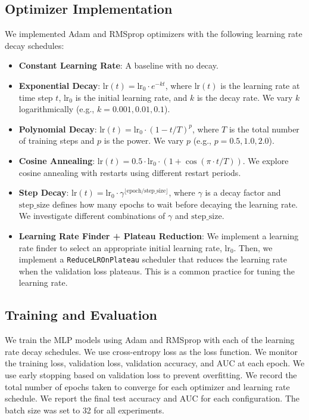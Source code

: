 \documentclass[conference]{IEEEtran}
\begin{document}
\subsection{Optimizer Implementation}
We implemented Adam and RMSprop optimizers with the following learning rate decay schedules:
\begin{itemize}
    \item \textbf{Constant Learning Rate}: A baseline with no decay.
    \item \textbf{Exponential Decay}: $\text{lr}(t) = \text{lr}_0 \cdot e^{-kt}$, where $\text{lr}(t)$ is the learning rate at time step $t$, $\text{lr}_0$ is the initial learning rate, and $k$ is the decay rate. We vary $k$ logarithmically (e.g., $k = 0.001, 0.01, 0.1$).
    \item \textbf{Polynomial Decay}: $\text{lr}(t) = \text{lr}_0 \cdot (1 - t/T)^p$, where $T$ is the total number of training steps and $p$ is the power. We vary $p$ (e.g., $p = 0.5, 1.0, 2.0$).
    \item \textbf{Cosine Annealing}: $\text{lr}(t) = 0.5 \cdot \text{lr}_0 \cdot (1 + \cos(\pi \cdot t/T))$. We explore cosine annealing with restarts using different restart periods.
    \item \textbf{Step Decay}: $\text{lr}(t) = \text{lr}_0 \cdot \gamma^{\lfloor \text{epoch}/\text{step\_size} \rfloor}$, where $\gamma$ is a decay factor and $\text{step\_size}$ defines how many epochs to wait before decaying the learning rate. We investigate different combinations of $\gamma$ and $\text{step\_size}$.
    \item \textbf{Learning Rate Finder + Plateau Reduction}: We implement a learning rate finder to select an appropriate initial learning rate, $\text{lr}_0$. Then, we implement a \texttt{ReduceLROnPlateau} scheduler that reduces the learning rate when the validation loss plateaus. This is a common practice for tuning the learning rate.
\end{itemize}

\subsection{Training and Evaluation}
We train the MLP models using Adam and RMSprop with each of the learning rate decay schedules. We use cross-entropy loss as the loss function. We monitor the training loss, validation loss, validation accuracy, and AUC at each epoch. We use early stopping based on validation loss to prevent overfitting. We record the total number of epochs taken to converge for each optimizer and learning rate schedule. We report the final test accuracy and AUC for each configuration.  The batch size was set to 32 for all experiments.
\end{document}
